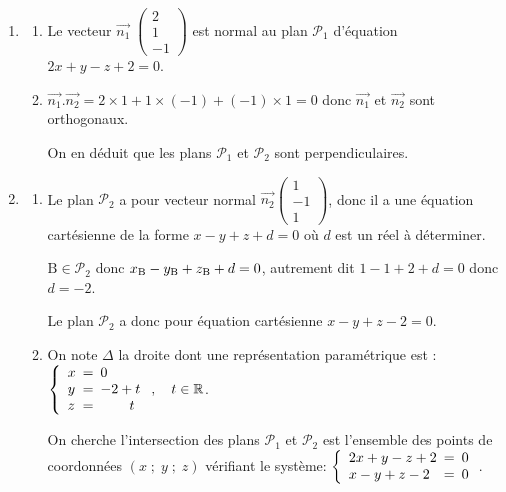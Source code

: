 \documentclass[10pt]{article}
\providecommand{\R}{\mathbb{R}}
\providecommand{\vect}[1]{\overrightarrow{#1}}
\begin{document}
\begin{enumerate}
\item 
	\begin{enumerate}
		\item  Le vecteur $\vect{n_1}\;\begin{pmatrix} 2 \\1 \\ -1\end{pmatrix}$ est normal au plan $\mathcal{P}_1$ d'équation $2x+y-z+2=0$.
		
		\item 
		


$\vect{n_1}.\vect{n_2} = 2\times 1 + 1\times (-1) +(-1)\times 1 = 0$ donc $\vect{n_1}$ et $\vect{n_2}$ sont orthogonaux. 

On en déduit que les plans $\mathcal{P}_1$ et $\mathcal{P}_2$ sont perpendiculaires. 
	\end{enumerate}
\item 
	\begin{enumerate}
		\item 
Le plan $\mathcal{P}_2$ a pour vecteur normal $\vect{n_2}\begin{pmatrix}1\\-1\\1\end{pmatrix}$, donc il a une équation cartésienne de la forme $x-y+z+d=0$ où $d$ est un réel à déterminer.

$\text{B} \in \mathcal{P}_2$ donc $x_{\text B}-y_{\text B}+z_{\text B}+d=0$, autrement dit $1 - 1 +2 +d=0$ donc $d=-2$.

Le plan $\mathcal{P}_2$ a donc pour équation cartésienne $x-y+z-2=0$.

		\item On note $\Delta$ la droite dont une représentation paramétrique est : $\left\{\begin{array}{l !{=} l}
x&0\\y & -2 + t\\ z&\phantom{2+t}t
\end{array}\right.,\quad t \in  \R$.

On cherche l'intersection des plans $\mathcal{P}_1$ et $\mathcal{P}_2$ est l'ensemble des points de coordonnées $(x\;;\;y\;;\;z)$ vérifiant le système:
$\left \{
\begin{array}{l !{=} l}
2x+y-z +2 & 0\\
x - y + z - 2&0
\end{array}
\right .$.


\end{enumerate}
\end{enumerate}
\end{document}
